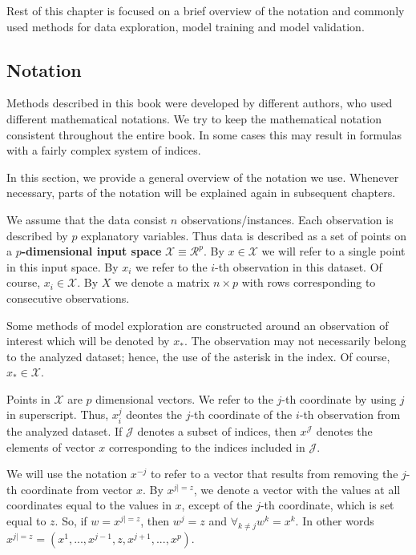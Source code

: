 \documentclass[12pt,]{krantz}
\begin{document}
Rest of this chapter is focused on a brief overview of the notation and commonly used methods for data exploration, model training and model validation.

\hypertarget{notation}{%
\subsection{Notation}\label{notation}}

Methods described in this book were developed by different authors, who used different mathematical notations.
We try to keep the mathematical notation consistent throughout the entire book. In some cases this may result in formulas with a fairly complex system of indices.

In this section, we provide a general overview of the notation we use. Whenever necessary, parts of the notation will be explained again in subsequent chapters.

We assume that the data consist \(n\) observations/instances. Each observation is described by \(p\) explanatory variables. Thus data is described as a set of points on a \textbf{\(p\)-dimensional input space} \(\mathcal X \equiv \mathcal R^p\). By \(x \in \mathcal X\) we will refer to a single point in this input space.
By \(x_i\) we refer to the \(i\)-th observation in this dataset. Of course, \(x_i \in \mathcal X\). By \(X\) we denote a matrix \(n\times p\) with rows corresponding to consecutive observations.

Some methods of model exploration are constructed around an observation of interest which will be denoted by \(x_{*}\). The observation may not necessarily belong to the analyzed dataset; hence, the use of the asterisk in the index. Of course, \(x_* \in \mathcal X\).

Points in \(\mathcal X\) are \(p\) dimensional vectors. We refer to the \(j\)-th coordinate by using \(j\) in superscript. Thus, \(x^j_i\) deontes the \(j\)-th coordinate of the \(i\)-th observation from the analyzed dataset. If \(\mathcal J\) denotes a subset of indices, then \(x^{\mathcal J}\) denotes the elements of vector \(x\) corresponding to the indices included in \(\mathcal J\).

We will use the notation \(x^{-j}\) to refer to a vector that results from removing the \(j\)-th coordinate from vector \(x\). By \textbf{\(x^{j|=z}\)}, we denote a vector with the values at all coordinates equal to the values in \(x\), except of the \(j\)-th coordinate, which is set equal to \(z\). So, if \(w=x^{j|=z}\), then \(w^j = z\) and \(\forall_{k\neq j} w^k = x^k\). In other words \(x^{j|=z} = (x^1, ..., x^{j-1}, z, x^{j+1}, ..., x^p)\).
\end{document}
